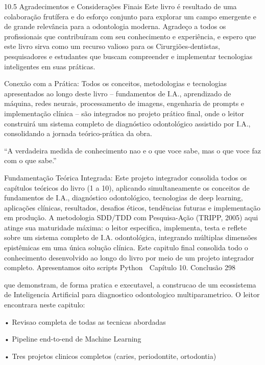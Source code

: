10.5      Agradecimentos e Considerações Finais
Este livro é resultado de uma colaboração frutífera e do esforço conjunto para explorar
um campo emergente e de grande relevância para a odontologia moderna. Agradeço
a todos os profissionais que contribuíram com seu conhecimento e experiência, e
espero que este livro sirva como um recurso valioso para os Cirurgiões-dentistas,
pesquisadores e estudantes que buscam compreender e implementar tecnologias
inteligentes em suas práticas.

Conexão com a Prática: Todos os conceitos, metodologias e tecnologias apresentados
ao longo deste livro – fundamentos de I.A., aprendizado de máquina, redes neurais,
processamento de imagens, engenharia de prompts e implementação clínica – são
integrados no projeto prático final, onde o leitor construirá um sistema completo de
diagnóstico odontológico assistido por I.A., consolidando a jornada teórico-prática da
obra.

     “A verdadeira medida de conhecimento nao e o que voce sabe, mas o que
     voce faz com o que sabe.”

Fundamentação Teórica Integrada: Este projeto integrador consolida todos os
capítulos teóricos do livro (1 a 10), aplicando simultaneamente os conceitos de
fundamentos de I.A., diagnóstico odontológico, tecnologias de deep learning, aplicações
clínicas, resultados, desafios éticos, tendências futuras e implementação em produção.
A metodologia SDD/TDD com Pesquisa-Ação (TRIPP, 2005) aqui atinge sua maturidade
máxima: o leitor especifica, implementa, testa e reflete sobre um sistema completo de
I.A. odontológica, integrando múltiplas dimensões epistêmicas em uma única solução
clínica.
         Este capitulo final consolida todo o conhecimento desenvolvido ao longo do
livro por meio de um projeto integrador completo. Apresentamos oito scripts Python
     Capítulo 10. Conclusão                                                                        298


     que demonstram, de forma pratica e executavel, a construcao de um ecossistema de
     Inteligencia Artificial para diagnostico odontologico multiparametrico.
              O leitor encontrara neste capitulo:

         • Revisao completa de todas as tecnicas abordadas

         • Pipeline end-to-end de Machine Learning

         • Tres projetos clinicos completos (caries, periodontite, ortodontia)

